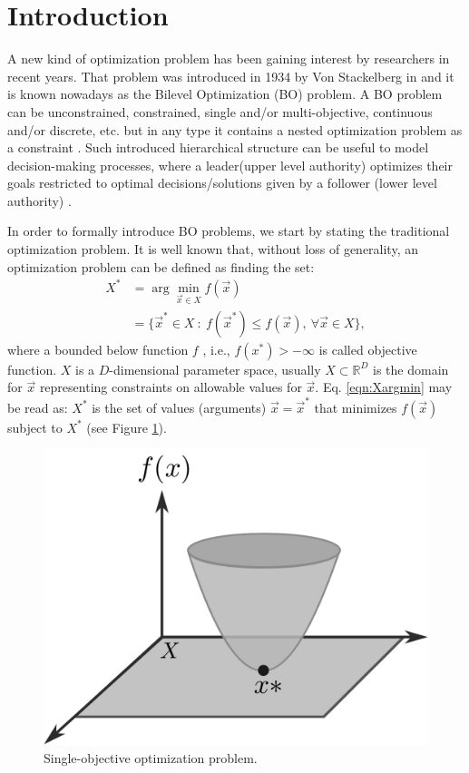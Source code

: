 \documentclass[conference]{IEEEtran}
\begin{document}
\IEEEpeerreviewmaketitle


\section{Introduction}

A new kind of optimization problem has been gaining interest by researchers in
recent years. That problem was introduced in 1934 by Von Stackelberg in \cite{von2010market} 
and it is known nowadays as the  Bilevel Optimization (BO) problem. A BO problem
can be unconstrained, constrained, single and/or multi-objective, continuous and/or
discrete, etc. but in any type it contains a nested optimization problem as a
constraint \cite{bard2013practical,dempe2002foundations}. Such introduced hierarchical
structure can be useful to model decision-making processes, where a leader(upper
level authority) optimizes their goals restricted to optimal decisions/solutions
given by a follower (lower level authority)
\cite{brotcorne2001bilevel,kalashnikov2010comparison,sinha2015transportation,von1945theory,wang2014bilevel}.

In order to formally introduce BO problems, we start by stating the traditional
optimization problem. It is well known that, without loss of generality, an
optimization problem can be defined as finding the set:
% 
\begin{align}
    \label{eqn:Xargmin}
    X^* &= \arg \min_{\vec{x} \in X} f(\vec{x}) \\ \nonumber
    &= \{ \vec{x}^* \in X \ : \ f(\vec{x}^*) \leq f( \vec{x} ), \ 
    \forall
    \vec{x} \in X \},
\end{align}
% 
where a bounded below function $f$ , i.e., $f(x^*) > -\infty$ is called objective
function. $X$ is a $D$-dimensional parameter space, usually $X \subset \mathbb{R}^D$
is the domain for $\vec{x}$ representing constraints on allowable values for $\vec{x}$.
Eq. \ref{eqn:Xargmin} may be read as: $X^*$ is the set of values (arguments)
$\vec{x} = \vec{x}^*$ that minimizes $f(\vec{x})$ subject to $X^*$ (see Figure \ref{fig:single-level}).

% 
\begin{figure}[!ht]
    \centering
    \includegraphics[width=0.5\linewidth]{img/monolevel.pdf}
    \caption{Single-objective optimization problem.}
    \label{fig:single-level}
\end{figure}
\end{document}
